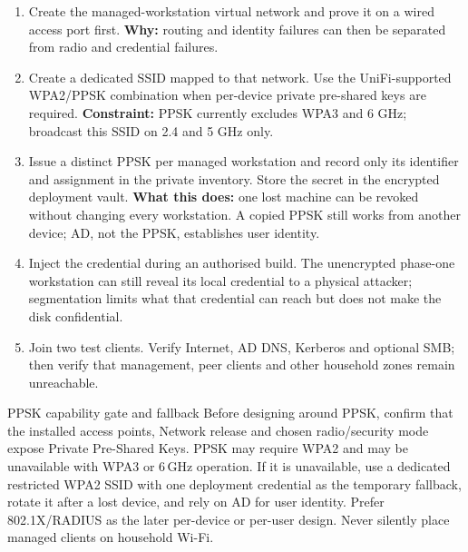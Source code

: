 \begin{enumerate}
\item Create the managed-workstation virtual network and prove it on a wired
access port first.  \textbf{Why:} routing and identity failures can then be
separated from radio and credential failures.
\item Create a dedicated SSID mapped to that network.  Use the UniFi-supported
WPA2/PPSK combination when per-device private pre-shared keys are required.
\textbf{Constraint:} PPSK currently excludes WPA3 and 6 GHz; broadcast this
SSID on 2.4 and 5 GHz only.
\item Issue a distinct PPSK per managed workstation and record only its
identifier and assignment in the private inventory.  Store the secret in the
encrypted deployment vault.  \textbf{What this does:} one lost machine can be
revoked without changing every workstation.  A copied PPSK still works from
another device; AD, not the PPSK, establishes user identity.
\item Inject the credential during an authorised build.  The unencrypted
phase-one workstation can still reveal its local credential to a physical
attacker; segmentation limits what that credential can reach but does not make
the disk confidential.
\item Join two test clients.  Verify Internet, AD DNS, Kerberos and optional SMB;
then verify that management, peer clients and other household zones remain
unreachable.
\end{enumerate}

\begin{telospanel}{PPSK capability gate and fallback}
Before designing around PPSK, confirm that the installed access points,
Network release and chosen radio/security mode expose Private Pre-Shared Keys.
PPSK may require WPA2 and may be unavailable with WPA3 or 6\,GHz operation.
If it is unavailable, use a dedicated restricted WPA2 SSID with one deployment
credential as the temporary fallback, rotate it after a lost device, and rely
on AD for user identity.  Prefer 802.1X/RADIUS as the later per-device or
per-user design.  Never silently place managed clients on household Wi-Fi.
\end{telospanel}

